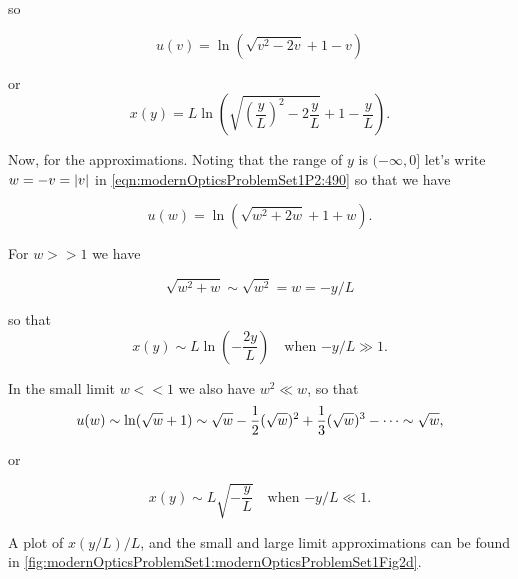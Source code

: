 {\begin{enumerate}
so

\begin{dmath}\label{eqn:modernOpticsProblemSet1P2:490}
u(v) = \ln\left( \sqrt{v^2 - 2 v} + 1 - v \right)
\end{dmath}

or
\begin{dmath}\label{eqn:modernOpticsProblemSet1P2:510}
\boxed{
x(y) = L \ln\left( \sqrt{\left(\frac{y}{L}\right)^2 - 2 \frac{y}{L}} + 1 - \frac{y}{L} \right).
}
\end{dmath}

Now, for the approximations.  Noting that the range of $y$ is $(-\infty, 0]$ let's write $w = -v = {\left\lvert{v}\right\rvert}$ in \cref{eqn:modernOpticsProblemSet1P2:490} so that we have

\begin{dmath}\label{eqn:modernOpticsProblemSet1P2:490b}
u(w) = \ln\left( \sqrt{w^2 + 2 w} + 1 + w \right).
\end{dmath}

For $w >> 1$ we have 

\begin{equation}\label{eqn:modernOpticsProblemSet1P2:610}
\sqrt{w^2 + w} \sim \sqrt{w^2} = w = -y/L
\end{equation}

so that
\begin{dmath}\label{eqn:modernOpticsProblemSet1P2:490c}
\boxed{
x(y) \sim L \ln\left( -\frac{2 y}{L} \right) \quad \mbox{when $-y/L \gg 1$}.
}
\end{dmath}

In the small limit $w << 1$ we also have $w^2 \ll w$, so that
\begin{dmath}\label{eqn:modernOpticsProblemSet1P2:630}
u(w) 
\sim \ln( \sqrt{w} + 1)
\sim \sqrt{w} - \inv{2} (\sqrt{w})^2 + \inv{3}(\sqrt{w})^3 - \cdots
\sim \sqrt{w},
\end{dmath}

or

\begin{equation}\label{eqn:modernOpticsProblemSet1P2:650}
\boxed{
x(y) \sim L \sqrt{-\frac{y}{L}} \quad \mbox{when $-y/L \ll 1$}.
}
\end{equation}

A plot of $x(y/L)/L$, and the small and large limit approximations can be found in \cref{fig:modernOpticsProblemSet1:modernOpticsProblemSet1Fig2d}.



\end{enumerate}}
